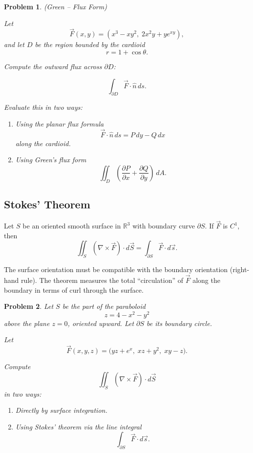 \documentclass{article}
\newtheorem{problem}{Problem}
\begin{document}
\begin{problem}
(Green -- Flux Form)

Let 
\[
\vec{F}(x,y) = (x^3 - xy^2,\; 2x^2 y + y e^{xy}),
\]
and let $D$ be the region bounded by the cardioid
\[
r = 1 + \cos\theta.
\]

Compute the outward flux across $\partial D$:

\[
\int_{\partial D} \vec{F}\cdot \hat{n}\, ds.
\]

Evaluate this in two ways:

\begin{enumerate}
    \item Using the planar flux formula 
    \[
    \vec{F}\cdot \hat{n}\,ds = P\,dy - Q\,dx
    \]
    along the cardioid.
    \item Using Green's flux form
    \[
    \iint_D \left( \frac{\partial P}{\partial x} + \frac{\partial Q}{\partial y} \right)\, dA.
    \]
\end{enumerate}
\end{problem}

\subsection{Stokes' Theorem}

Let \(S\) be an oriented smooth surface in \(\mathbb{R}^3\) with boundary curve \(\partial S\).  
If \(\vec{F}\) is \(C^1\), then
\[
\iint_S (\nabla \times \vec{F}) \cdot d\vec{S}
=
\int_{\partial S} \vec{F} \cdot d\vec{s}.
\]

The surface orientation must be compatible with the boundary orientation (right-hand rule).  
The theorem measures the total ``circulation'' of \(\vec{F}\) along the boundary in terms of curl through the surface.

\begin{problem}
Let $S$ be the part of the paraboloid 
\[
z = 4 - x^2 - y^2
\]
above the plane $z = 0$, oriented upward.  
Let $\partial S$ be its boundary circle.

Let
\[
\vec{F}(x,y,z) =
\big( yz + e^x,\; xz + y^2,\; xy - z \big).
\]

Compute
\[
\iint_S (\nabla \times \vec{F})\cdot d\vec{S}
\]
in two ways:

\begin{enumerate}
    \item Directly by surface integration.
    \item Using Stokes' theorem via the line integral
    \[
    \int_{\partial S} \vec{F}\cdot d\vec{s}.
    \]
\end{enumerate}
\end{problem}
\end{document}
